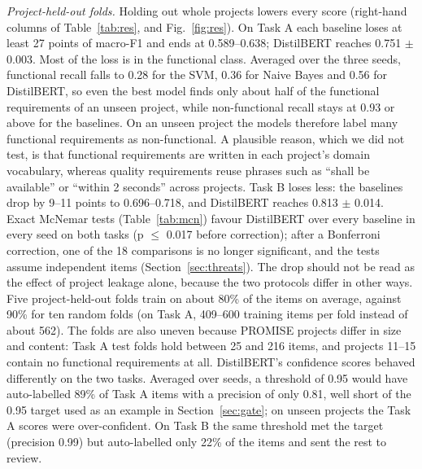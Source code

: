 \documentclass[conference,10pt,letterpaper]{IEEEtran}
\begin{document}
\emph{Project-held-out folds.} Holding out whole projects lowers every score (right-hand columns of Table~\ref{tab:res}, and Fig.~\ref{fig:res}). On Task A each baseline loses at least 27 points of macro-F1 and ends at 0.589–0.638; DistilBERT reaches 0.751 $\pm$ 0.003. Most of the loss is in the functional class. Averaged over the three seeds, functional recall falls to 0.28 for the SVM, 0.36 for Naive Bayes and 0.56 for DistilBERT, so even the best model finds only about half of the functional requirements of an unseen project, while non-functional recall stays at 0.93 or above for the baselines. On an unseen project the models therefore label many functional requirements as non-functional. A plausible reason, which we did not test, is that functional requirements are written in each project's domain vocabulary, whereas quality requirements reuse phrases such as “shall be available” or “within 2 seconds” across projects. Task B loses less: the baselines drop by 9–11 points to 0.696–0.718, and DistilBERT reaches 0.813 $\pm$ 0.014. Exact McNemar tests (Table~\ref{tab:mcn}) favour DistilBERT over every baseline in every seed on both tasks (p $\leq$ 0.017 before correction); after a Bonferroni correction, one of the 18 comparisons is no longer significant, and the tests assume independent items (Section~\ref{sec:threats}). The drop should not be read as the effect of project leakage alone, because the two protocols differ in other ways. Five project-held-out folds train on about 80\% of the items on average, against 90\% for ten random folds (on Task A, 409–600 training items per fold instead of about 562). The folds are also uneven because PROMISE projects differ in size and content: Task A test folds hold between 25 and 216 items, and projects 11–15 contain no functional requirements at all. DistilBERT's confidence scores behaved differently on the two tasks. Averaged over seeds, a threshold of 0.95 would have auto-labelled 89\% of Task A items with a precision of only 0.81, well short of the 0.95 target used as an example in Section~\ref{sec:gate}; on unseen projects the Task A scores were over-confident. On Task B the same threshold met the target (precision 0.99) but auto-labelled only 22\% of the items and sent the rest to review.
\end{document}
